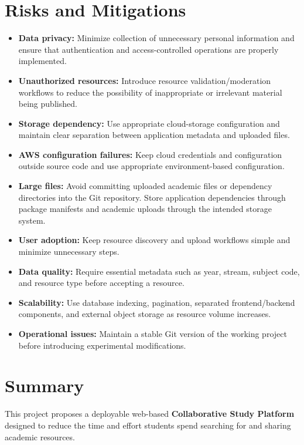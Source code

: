 \documentclass[11pt,a4paper]{article}
\begin{document}
\section{Risks and Mitigations}
\begin{itemize}[leftmargin=*]
    \item \textbf{Data privacy:} Minimize collection of unnecessary personal information and ensure that authentication and access-controlled operations are properly implemented.
    \item \textbf{Unauthorized resources:} Introduce resource validation/moderation workflows to reduce the possibility of inappropriate or irrelevant material being published.
    \item \textbf{Storage dependency:} Use appropriate cloud-storage configuration and maintain clear separation between application metadata and uploaded files.
    \item \textbf{AWS configuration failures:} Keep cloud credentials and configuration outside source code and use appropriate environment-based configuration.
    \item \textbf{Large files:} Avoid committing uploaded academic files or dependency directories into the Git repository. Store application dependencies through package manifests and academic uploads through the intended storage system.
    \item \textbf{User adoption:} Keep resource discovery and upload workflows simple and minimize unnecessary steps.
    \item \textbf{Data quality:} Require essential metadata such as year, stream, subject code, and resource type before accepting a resource.
    \item \textbf{Scalability:} Use database indexing, pagination, separated frontend/backend components, and external object storage as resource volume increases.
    \item \textbf{Operational issues:} Maintain a stable Git version of the working project before introducing experimental modifications.
\end{itemize}

\section{Summary}
This project proposes a deployable web-based \textbf{Collaborative Study Platform} designed to reduce the time and effort students spend searching for and sharing academic resources.
\end{document}
